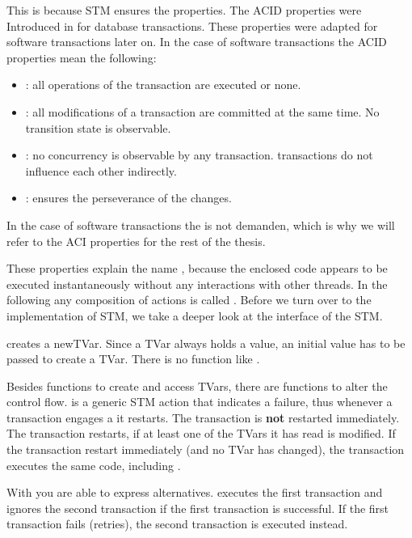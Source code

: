 This is because STM ensures the  properties. The ACID properties were Introduced in \parencite{DBTrans} for
database transactions. These properties were adapted for software transactions later on.
In the case of software transactions the ACID properties mean the following:
\begin{itemize}
 \item {}: all operations of the transaction are executed or none.
 \item {}: all modifications of a transaction are committed at the same time. No transition state is observable.
 \item {}: no concurrency is observable by any transaction. transactions do not influence each other indirectly.
 \item {}: ensures the perseverance of the changes.
\end{itemize}
In the case of software transactions the  is not demanden, which is why we will refer to the ACI properties
for the rest of the thesis.

These properties explain the name , because the enclosed code appears to be executed instantaneously without any 
interactions with other threads. In the following any composition of  actions is called .
Before we turn over to the implementation of STM, we take a deeper look at the interface of the STM.

 creates a newTVar. Since a TVar always holds a value, an initial value has to be
passed to create a TVar. There is no function like . 

Besides functions to create and access TVars, there are functions to alter the control flow.
 is a generic STM action that indicates a failure, thus whenever a transaction engages a  it restarts. The transaction
is \textbf{not} restarted immediately. The transaction restarts, if at least one of the TVars it has read is modified. If the transaction 
restart immediately (and no TVar has changed), the transaction executes the same code, including . 

With  you are able to express alternatives.  executes the first transaction
and ignores the second transaction if the first transaction is successful. If the first transaction fails (retries), the second transaction is 
executed instead.

